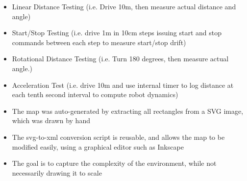 \documentclass[12pt]{article}
\begin{document}
\begin{itemize}
    \setlength{\itemsep}{0pt}
    \setlength{\parskip}{0pt}
    \setlength{\parsep}{0pt}
    \item Linear Distance Testing (i.e. Drive 10m, then measure actual
      distance and angle)
    \item Start/Stop Testing (i.e. drive 1m in 10cm steps issuing
      start and stop commands between each step to measure start/stop drift)
    \item Rotational Distance Testing (i.e. Turn 180 degrees, then measure
      actual angle.)
    \item Acceleration Test (i.e. drive 10m and use internal timer to log
      distance at each tenth second interval to compute robot dynamics)
\end{itemize}

\begin{itemize}
    \setlength{\itemsep}{0pt}
    \setlength{\parskip}{0pt}
    \setlength{\parsep}{0pt}
    \item The map was auto-generated by extracting all rectangles from a SVG
          image, which was drawn by hand
    \item The svg-to-xml conversion script is reusable, and allows the map to be
          modified easily, using a graphical editor such as Inkscape
    \item The goal is to capture the complexity of the environment, while not
          necessarily drawing it to scale
\end{itemize}
\end{document}
